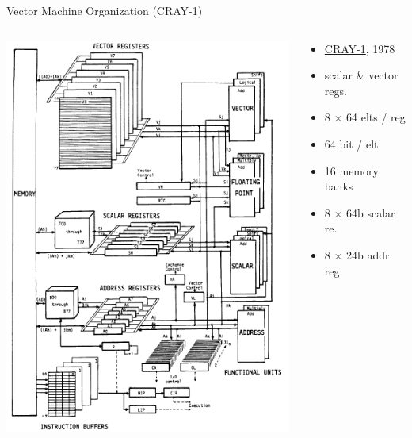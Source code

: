 \documentclass[presentation]{beamer}
\begin{document}
\begin{frame}[label={sec:orgef38a8a}]{Vector Machine Organization (CRAY-1)}
\begin{columns}
\begin{column}{.60\columnwidth}
\begin{block}{}
\begin{center}
\includegraphics[width=.9\linewidth]{./images/slides_SIMD_30_small.png}
\end{center}
\end{block}
\end{column}

\begin{column}{.39\columnwidth}
\begin{block}{}
\begin{itemize}
\item \href{https://www.eecg.utoronto.ca/\~moshovos/ACA05/read/cray1.pdf}{CRAY-1}, 1978
\item scalar \& vector regs.
\item 8 \(\times\) 64 elts / reg
\item 64 bit / elt
\item 16 memory banks
\item 8 \(\times\) 64b scalar re.
\item 8 \(\times\) 24b addr. reg.
\end{itemize}
\end{block}
\end{column}
\end{columns}
\end{frame}
\end{document}
